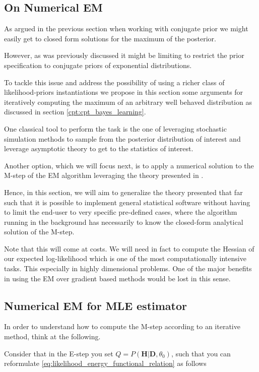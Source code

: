 \documentclass[11pt]{article}
\begin{document}
\begin{article}
\newpage

\section{On Numerical EM}
\label{numerical-em}
As argued in the previous section when working with conjugate prior
we might easily get to closed form solutions for the maximum of the
posterior.

However, as was previously discussed it might be limiting to
restrict the prior specification to conjugate priors of exponential
distributions.

To tackle this issue and address the possibility of using a richer
class of likelihood-priors instantiations we propose in this
section some arguments for iteratively computing the maximum of an
arbitrary well behaved distribution as discussed in section
\ref{cpt:cpt_bayes_learning}.

One classical tool to perform the task is the one of leveraging
stochastic simulation methods to sample from the posterior
distribution of interest and leverage asymptotic theory to get to
the statistics of interest.

Another option, which we will focus next, is to apply a numerical
solution to the M-step of the EM algorithm leveraging the theory
presented in \cite{ruud1989comparison}.

Hence, in this section, we will aim to generalize the theory
presented that far such that it is possible to implement general
statistical software without having to limit the end-user to very
specific pre-defined cases, where the algorithm running in the
background has necessarily to know the closed-form analytical
solution of the M-step.

Note that this will come at costs. We will need in fact to compute
the Hessian of our expected log-likelihood which is one of the most
computationally intensive tasks. This especially in highly
dimensional problems. One of the major benefits in using the EM over
gradient based methods would be lost in this sense.

\subsection{Numerical EM for MLE estimator}
\label{sec:orgb9cb36f}

In order to understand how to compute the M-step according to an
iterative method, think at the following.

Consider that in the E-step you set \(Q = P (\textbf{H}| \textbf{D}, \theta_0)\), such
that you can reformulate
\ref{eq:likelihood_energy_functional_relation} as follows


\end{article}
\end{document}
